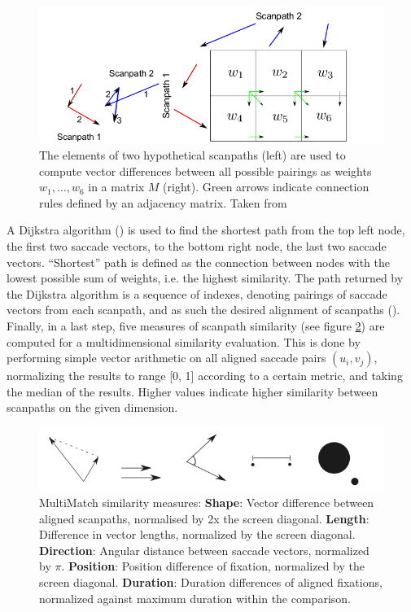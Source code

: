 \documentclass[a4paper, 12pt]{scrreprt}
\begin{document}
\begin{figure}
	\includegraphics[scale=0.4]{img/weightedgraph.png}
	\caption[Scanpath alignment as a shortest-path problem.]
	{\small{The elements of two hypothetical scanpaths (left) are used to compute vector differences between all possible pairings as weights $w_1, \ldots, w_6$ in a matrix $M$ (right). Green arrows indicate connection rules defined by an adjacency matrix. Taken from \textcite{jarodzka2010vector}}}
	\label{fig:directedgraph}
\end{figure}

A Dijkstra algorithm (\cite{dijkstra1959note}) is used to find the shortest path from the top left node, the first two saccade vectors, to the bottom right node, the last two saccade vectors. “Shortest” path is defined as the connection between nodes with the lowest possible sum of weights, i.e. the highest similarity. The path returned by the Dijkstra algorithm is a sequence of indexes, denoting pairings of saccade vectors from each scanpath, and as such the desired alignment of scanpaths (\cite{dewhurst2012depends}).  Finally, in a last step, five measures of scanpath similarity (see figure \ref{fig:simmeasures}) are computed for a multidimensional similarity evaluation. This is done by performing simple vector arithmetic on all aligned saccade pairs $(u_i, v_j)$, normalizing the results to range [0, 1] according to a certain metric, and taking the median of the results. Higher values indicate higher similarity between scanpaths on the given dimension. \newline

\begin{figure}[H]
	\includegraphics[scale=0.5]{img/simmeasures.png}
	\caption[Similarity measures]{\small{MultiMatch similarity measures: \textbf{Shape}: Vector difference between aligned scanpaths, normalised by 2x the screen diagonal. \textbf{Length}: Difference in vector lengths, normalized by the screen diagonal. \textbf{Direction}: Angular distance between saccade vectors, normalized by $\pi$. \textbf{Position}: Position difference of fixation, normalized by the screen diagonal. \textbf{Duration}: Duration differences of aligned fixations, normalized against maximum duration within the comparison.}}
	\label{fig:simmeasures}
\end{figure}
\end{document}
